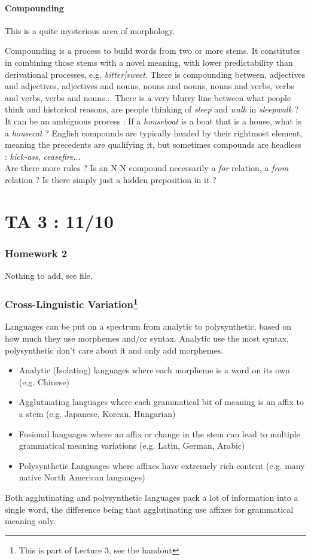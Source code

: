 \documentclass{cours}
\begin{document}
\subsection{Compounding}
This is a quite mysterious area of morphology.

Compounding is a process to build words from two or more stems. It constitutes in combining those stems with a novel meaning, with lower predictability than derivational processes, e.g. \textsl{bitter|sweet}. There is compounding between, adjectives and adjectives, adjectives and nouns, nouns and nouns, nouns and verbs, verbs and verbs, verbs and nouns... There is a very blurry line between what people think and historical reasons, are people thinking of \textsl{sleep} and \textsl{walk} in \textsl{sleepwalk} ?\\
It can be an ambiguous process : If a \textsl{houseboat} is a boat that is a house, what is a \textsl{housecat} ? English compounds are typically headed by their rightmost element, meaning the precedents are qualifying it, but sometimes compounds are headless : \textsl{kick-ass}, \textsl{ceasefire}...\\
Are there more rules ? Is an N-N compound necessarily a \textit{for} relation, a \textit{from} relation ? Is there simply just a hidden preposition in it ? 


\part{TA 3 : 11/10}
\section{Homework 2}
Nothing to add, see file. 

\section[Cross-Linguistic Variation]{Cross-Linguistic Variation\footnote{This is part of Lecture 3, see the handout}}
Languages can be put on a spectrum from analytic to polysynthetic, based on how much they use morphemes and/or syntax.
Analytic use the most syntax, polysynthetic don't care about it and only add morphemes.
\begin{itemize}
    \item Analytic (Isolating) languages where each morpheme is a word on its own (e.g. Chinese)
    \item Agglutinating languages where each grammatical bit of meaning is an affix to a stem (e.g. Japanese, Korean, Hungarian)
    \item Fusional languages where an affix or change in the stem can lead to multiple grammatical meaning variations (e.g. Latin, German, Arabic)
    \item Polysynthetic Languages where affixes have extremely rich content (e.g. many native North American languages)
\end{itemize}
Both agglutinating and polysynthetic languages pack a lot of information into a single word, the difference being that agglutinating use affixes for grammatical meaning only.
\end{document}
